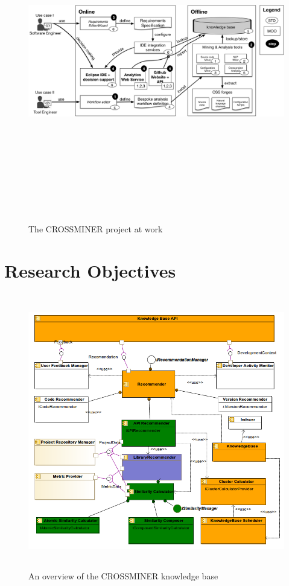 \begin{figure}[!t]
\includegraphics[width=14cm,height=14cm,keepaspectratio]{images/crossminer.png}
\centering
\caption{The CROSSMINER project at work}
\label{fig:crossminerApproach}
\end{figure}


\section{Research Objectives}
\begin{figure}[!h]
	\includegraphics[width=12cm,height=12cm,keepaspectratio]{images/Kb.png}
	\centering
	\caption{An overview of the CROSSMINER knowledge base}
	\label{fig:crossminerKB}
\end{figure}


